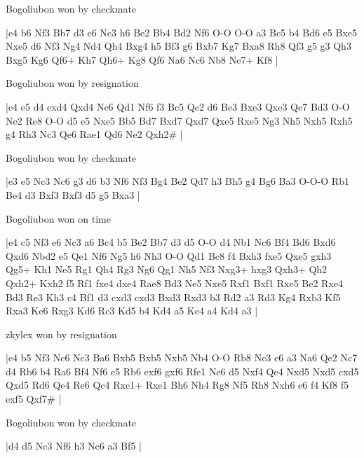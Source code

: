 \showboard

Bogoliubon won by checkmate

\makegametitle
|e4 b6 Nf3 Bb7 d3 e6 Nc3 h6 Be2 Bb4 Bd2 Nf6 O-O O-O a3 Bc5 b4 Bd6 e5 Bxe5 Nxe5 d6 Nf3 Ng4 Nd4 Qh4 Bxg4 h5 Bf3 g6 Bxb7 Kg7 Bxa8 Rh8 Qf3 g5 g3 Qh3 Bxg5 Kg6 Qf6+ Kh7 Qh6+ Kg8 Qf6 Na6 Nc6 Nb8 Ne7+ Kf8  |

\showboard

Bogoliubon won by resignation

\makegametitle
|e4 e5 d4 exd4 Qxd4 Nc6 Qd1 Nf6 f3 Bc5 Qe2 d6 Be3 Bxe3 Qxe3 Qe7 Bd3 O-O Ne2 Re8 O-O d5 e5 Nxe5 Bb5 Bd7 Bxd7 Qxd7 Qxe5 Rxe5 Ng3 Nh5 Nxh5 Rxh5 g4 Rh3 Nc3 Qe6 Rae1 Qd6 Ne2 Qxh2\#  |

\showboard

Bogoliubon won by checkmate

\makegametitle
|e3 e5 Nc3 Nc6 g3 d6 b3 Nf6 Nf3 Bg4 Be2 Qd7 h3 Bh5 g4 Bg6 Ba3 O-O-O Rb1 Be4 d3 Bxf3 Bxf3 d5 g5 Bxa3  |

\showboard

Bogoliubon won on time

\makegametitle
|e4 c5 Nf3 e6 Nc3 a6 Bc4 b5 Be2 Bb7 d3 d5 O-O d4 Nb1 Nc6 Bf4 Bd6 Bxd6 Qxd6 Nbd2 e5 Qe1 Nf6 Ng5 h6 Nh3 O-O Qd1 Bc8 f4 Bxh3 fxe5 Qxe5 gxh3 Qg5+ Kh1 Ne5 Rg1 Qh4 Rg3 Ng6 Qg1 Nh5 Nf3 Nxg3+ hxg3 Qxh3+ Qh2 Qxh2+ Kxh2 f5 Rf1 fxe4 dxe4 Rae8 Bd3 Ne5 Nxe5 Rxf1 Bxf1 Rxe5 Be2 Rxe4 Bd3 Re3 Kh3 c4 Bf1 d3 cxd3 cxd3 Bxd3 Rxd3 b3 Rd2 a3 Rd3 Kg4 Rxb3 Kf5 Rxa3 Ke6 Rxg3 Kd6 Rc3 Kd5 b4 Kd4 a5 Ke4 a4 Kd4 a3  |

\showboard

zkylex won by resignation

\makegametitle
|e4 b5 Nf3 Nc6 Nc3 Ba6 Bxb5 Bxb5 Nxb5 Nb4 O-O Rb8 Nc3 c6 a3 Na6 Qe2 Nc7 d4 Rb6 b4 Ra6 Bf4 Nf6 e5 Rb6 exf6 gxf6 Rfe1 Ne6 d5 Nxf4 Qe4 Nxd5 Nxd5 cxd5 Qxd5 Rd6 Qe4 Re6 Qc4 Rxe1+ Rxe1 Bh6 Nh4 Rg8 Nf5 Rh8 Nxh6 e6 f4 Kf8 f5 exf5 Qxf7\#  |

\showboard

Bogoliubon won by checkmate

\makegametitle
|d4 d5 Nc3 Nf6 h3 Nc6 a3 Bf5  |


